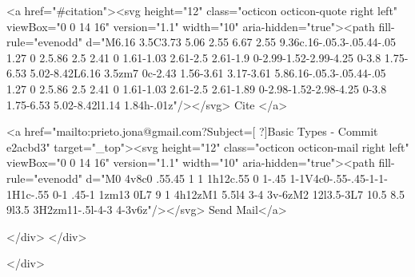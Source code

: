       <a  href="#citation"><svg height="12" class="octicon octicon-quote right left" viewBox="0 0 14 16" version="1.1" width="10" aria-hidden="true"><path fill-rule="evenodd" d="M6.16 3.5C3.73 5.06 2.55 6.67 2.55 9.36c.16-.05.3-.05.44-.05 1.27 0 2.5.86 2.5 2.41 0 1.61-1.03 2.61-2.5 2.61-1.9 0-2.99-1.52-2.99-4.25 0-3.8 1.75-6.53 5.02-8.42L6.16 3.5zm7 0c-2.43 1.56-3.61 3.17-3.61 5.86.16-.05.3-.05.44-.05 1.27 0 2.5.86 2.5 2.41 0 1.61-1.03 2.61-2.5 2.61-1.89 0-2.98-1.52-2.98-4.25 0-3.8 1.75-6.53 5.02-8.42l1.14 1.84h-.01z"/></svg> Cite
      </a>

      <a href="mailto:prieto.jona@gmail.com?Subject=[ ?]Basic Types - Commit e2acbd3" target="_top"><svg height="12" class="octicon octicon-mail right left" viewBox="0 0 14 16" version="1.1" width="10" aria-hidden="true"><path fill-rule="evenodd" d="M0 4v8c0 .55.45 1 1 1h12c.55 0 1-.45 1-1V4c0-.55-.45-1-1-1H1c-.55 0-1 .45-1 1zm13 0L7 9 1 4h12zM1 5.5l4 3-4 3v-6zM2 12l3.5-3L7 10.5 8.5 9l3.5 3H2zm11-.5l-4-3 4-3v6z"/></svg> Send Mail</a>

    </div>
  </div>

</div>




